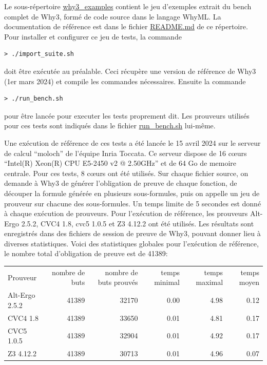 \documentclass[a4paper,11pt]{article}
\begin{document}
Le sous-répertoire \url{why3_examples} contient le jeu d'exemples
extrait du bench complet de Why3, formé de code source dans le langage
WhyML. La documentation de référence est dans le fichier \url{README.md} de ce répertoire.
Pour installer et configurer ce jeu de tests, la commande
\begin{lstlisting}
> ./import_suite.sh
\end{lstlisting}
doit être exécutée au préalable. Ceci récupère une version de
référence de Why3 (1er mars 2024) et compile les commandes nécessaires. Ensuite la commande
\begin{lstlisting}
> ./run_bench.sh
\end{lstlisting}
pour être lancée pour executer les tests proprement dit. Les prouveurs
utilisés pour ces tests sont indiqués dans le fichier
\url{run_bench.sh} lui-même.

Une exécution de référence de ces tests a été lancée le 15 avril 2024
sur le serveur de calcul ``moloch'' de l'équipe Inria Toccata. Ce
serveur dispose de 16 c{\oe}urs ``Intel(R) Xeon(R) CPU E5-2450 v2 @
2.50GHz'' et de 64 Go de memoire centrale. Pour ces tests, 8 c{\oe}urs
ont été utilisés. Sur chaque fichier source, on demande à Why3 de
générer l'obligation de preuve de chaque fonction, de découper la
formule générée en plusieurs sous-formules, puis on appelle un jeu de
prouveur sur chacune des sous-formules. Un temps limite de 5 secondes est donné à chaque exécution de prouveurs. Pour l'exécution de référence,
les prouveurs Alt-Ergo 2.5.2, CVC4 1.8, cvc5 1.0.5 et Z3 4.12.2 ont
été utilisés. Les résultats sont enregistrés dans des fichiers de
session de preuve de Why3, pouvant donner lieu à diverses
statistiques. Voici des statistiques globales pour l'exécution de
référence, le nombre total d'obligation de preuve est de 41389:
\begin{center}
  \begin{tabular}{|l|r|r|r|r|r|}
  \rowcolor{gray!50} Prouveur
  & \multicolumn{1}{p{0.13\textwidth}|}{nombre de buts}
  & \multicolumn{1}{p{0.13\textwidth}|}{nombre de buts prouvés}
  & \multicolumn{1}{p{0.13\textwidth}|}{temps minimal}
  & \multicolumn{1}{p{0.13\textwidth}|}{temps maximal}
  & \multicolumn{1}{p{0.13\textwidth}|}{temps moyen}
  \\
  Alt-Ergo 2.5.2                & 41389 & 32170 &  0.00  & 4.98 &  0.12 \\
  CVC4 1.8                      & 41389 & 33650 &  0.01  & 4.81 &  0.17 \\
  CVC5 1.0.5                    & 41389 & 32904 &  0.01  & 4.92 &  0.17 \\
  Z3 4.12.2                     & 41389 & 30713 &  0.01  & 4.96 &  0.07
\end{tabular}
\end{center}
\end{document}

